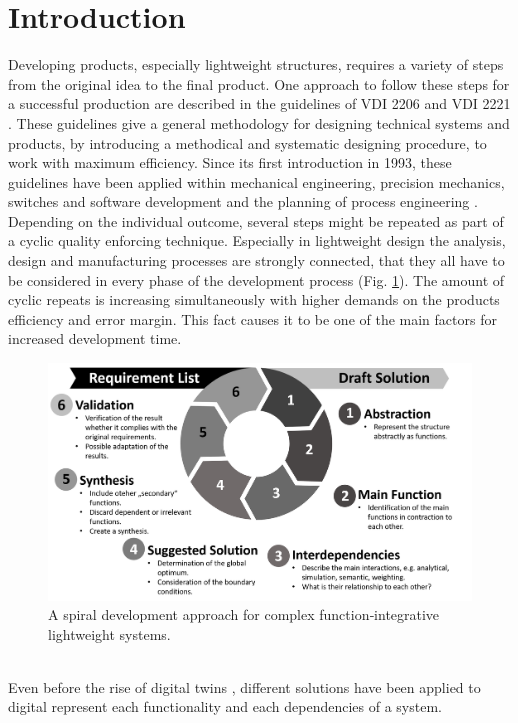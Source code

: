 \section{\label{sec:SoA}Introduction}
Developing products, especially lightweight structures, 
requires a variety of steps from the original idea to the final product.
One approach to follow these steps for a successful production 
are described in the guidelines of VDI 2206 \cite{gausmeier2002} and VDI 2221 \cite{Jansch2006THEDO}.
These guidelines give a general methodology for designing technical systems and products, 
by introducing a methodical and systematic designing procedure, to work with maximum efficiency.
Since its first introduction in 1993, these guidelines have been applied within mechanical engineering, precision mechanics, 
switches and software development and the planning of process engineering \cite{pahl_beitz_2013}. 
Depending on the individual outcome, several steps might be repeated as part of a cyclic quality enforcing technique.
Especially in lightweight design the analysis, design and manufacturing processes are strongly connected, 
that they all have to be considered in every phase of the development process (Fig. \ref{pic:interactive-design}).
The amount of cyclic repeats is increasing simultaneously with higher demands on the products efficiency and error margin.
This fact causes it to be one of the main factors for increased development time.\\
\begin{figure}[h]
    \centering
    \includegraphics[scale=0.4]{pics/cyclic-design.PNG}
    \caption{\label{pic:interactive-design} A spiral development approach for complex function‐integrative lightweight systems. \cite{Modler2020}}
\end{figure}\\
Even before the rise of digital twins \cite{Leitenberger2021}, different solutions have been applied to digital represent each functionality and each dependencies of a system.
